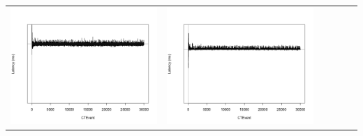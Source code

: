 \begin{table}[htbp]
{\begin{tabular}{l | ccccc}
\begin{minipage}{.15\textwidth}
				\vspace{2pt}
     			 	\includegraphics[width=\linewidth]{images/lat-log-graph/I9}
    				 \end{minipage}
    			   &	 \begin{minipage}{.15\textwidth}
     			 	
				\vspace{2pt}
     			 	\includegraphics[width=\linewidth]{images/lat-log-graph/I12}
    				 \end{minipage}
    			   &	 \begin{minipage}{.15\textwidth}
     			 	

\end{minipage}
\end{tabular}}
\end{table}
